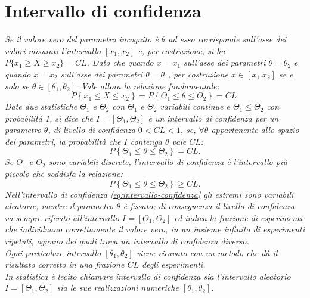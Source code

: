 \section{Intervallo di confidenza} %
\label{sec:intervallo-confidenza}
\emph{Se il valore vero del parametro incognito è $\theta$ ad esso corrisponde sull'asse dei valori misurati l'intervallo $[x_1,x_2]$ e, per costruzione, si ha $P\{x_1\ge X\ge x_2\}=CL$. Dato che quando $x=x_1$ sull'asse dei parametri $\theta=\theta_2$ e quando $x=x_2$ sull'asse dei parametri $\theta=\theta_1$, per costruzione $x\in[x_1.x_2]$ se e solo se $\theta \in [\theta_1,\theta_2]$. Vale allora la relazione fondamentale:
\begin{equation}
P\left\{ x_{ 1 }\le X\le x_{ 2 } \right\} =P\left\{ \Theta _{ 1 }\le \theta \le \Theta _{ 2 } \right\} =CL.
\end{equation}
Date due statistiche $\Theta _{ 1 }$ e $\Theta _{ 2 }$ con $\Theta _{ 1 }$ e $\Theta _{ 2 }$ variabili continue e $\Theta _{ 1 }\le \Theta _{ 2 }$ con probabilità 1, si dice che $I=\left[ \Theta _{ 1 },\Theta _{ 2 } \right] $ è un intervallo di confidenza per un parametro $\theta$, di livello di confidenza $0<CL<1$, se, $\forall \theta$ appartenente allo spazio dei parametri, la probabilità che $I$ contenga $\theta$ vale $CL$:
\begin{equation}
\label{eq:intervallo-confidenza}
P\left\{ \Theta _{ 1 }\le \theta \le \Theta _{ 2 } \right\} =CL.
\end{equation}
Se $\Theta _{ 1 }$ e $\Theta _{ 2 }$ sono variabili discrete, l'intervallo di confidenza è l'intervallo più piccolo che soddisfa la relazione:
\begin{equation}
P\left\{ \Theta _{ 1 }\le \theta \le \Theta _{ 2 } \right\} \ge CL.
\end{equation}
Nell'intervallo di confidenza \ref{eq:intervallo-confidenza} gli estremi sono variabili aleatorie, mentre il parametro $\theta$ è fissato; di conseguenza il livello di confidenza va sempre riferito all'intervallo $I=\left[ \Theta _{ 1 },\Theta _{ 2 } \right] $ ed indica la frazione di esperimenti che individuano correttamente il valore vero, in un insieme infinito di esperimenti ripetuti, ognuno dei quali trova un intervallo di confidenza diverso. \\ Ogni particolare intervallo $[\theta_1,\theta_2]$ viene ricavato con un metodo che dà il risultato corretto in una frazione $CL$ degli esperimenti. \\ In statistica è lecito chiamare intervallo di confidenza sia l'intervallo aleatorio $I=\left[ \Theta _{ 1 },\Theta _{ 2 } \right] $ sia le sue realizzazioni numeriche $[\theta_1,\theta_2]$.}

